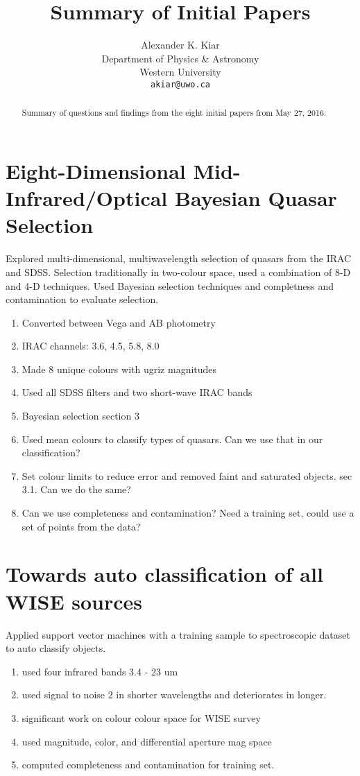 \documentclass{article}
\begin{document}
\title{Summary of Initial Papers} 
\author{Alexander K. Kiar\\Department of Physics \& Astronomy\\Western University\\ \texttt{akiar@uwo.ca}}
\maketitle 

\begin{abstract}
Summary of questions and findings from the eight initial papers from May 27, 2016.
\end{abstract} 

\section{Eight-Dimensional Mid-Infrared/Optical Bayesian Quasar Selection} 
Explored multi-dimensional, multiwavelength selection of quasars from the IRAC and SDSS. 
Selection traditionally in two-colour space, used a combination of 8-D and 4-D techniques. 
Used Bayesian selection techniques and completness and contamination to evaluate selection.  
\begin{enumerate}
\item Converted between Vega and AB photometry
\item IRAC channels: 3.6, 4.5, 5.8, 8.0
\item Made 8 unique colours with ugriz magnitudes 
\item Used all SDSS filters and two short-wave IRAC bands 
\item Bayesian selection section 3
\item Used mean colours to classify types of quasars. Can we use that in our classification? 
\item Set colour limits to reduce error and removed faint and saturated objects. sec 3.1. Can we do the same? 
\item Can we use completeness and contamination? Need a training set, could use a set of points from the data? 
\end{enumerate}

\section{Towards auto classification of all WISE sources}
Applied support vector machines with a training sample to spectroscopic dataset to auto classify objects. 
\begin{enumerate} 
\item used four infrared bands 3.4 - 23 um 
\item used signal to noise 2 in shorter wavelengths and deteriorates in longer. 
\item significant work on colour colour space for WISE survey 
\item used magnitude, color, and differential aperture mag space 
\item computed completeness and contamination for training set. 
\end{enumerate} 
\end{document}
